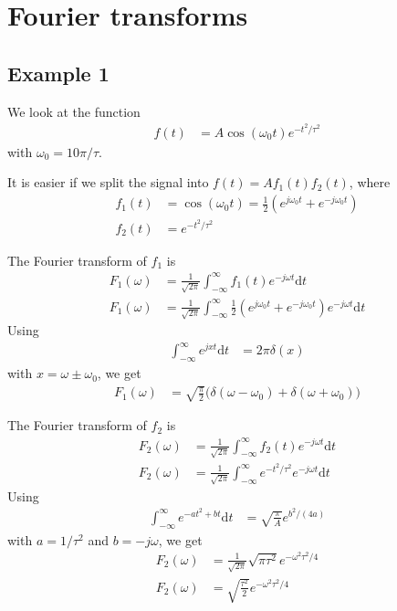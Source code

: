 \documentclass[twocolumn]{myarticle}
\renewcommand{\d}{\mathrm{d}}
\begin{document}
\section{Fourier transforms}
\label{sec:fourier_transforms}

\subsection{Example 1}
\label{subsec:example_1}

We look at the function
\begin{align}
    f(t) &= A \cos(\omega_0 t) e^{-t^2 / \tau^2}
\end{align}
with $ \omega_0 = 10 \pi / \tau $.

It is easier if we split the signal into $ f(t) = A f_1(t) f_2(t) $, where
\begin{align}
    f_1(t) &= \cos(\omega_0 t) = \frac{1}{2} \left( e^{j \omega_0 t} + e^{-j \omega_0 t} \right)
    \\
    f_2(t) &= e^{-t^2 / \tau^2}
\end{align}

The Fourier transform of $ f_1 $ is
\begin{align}
    F_1(\omega) &= \frac{1}{\sqrt{2 \pi}} \int_{-\infty}^{\infty} f_1(t) e^{-j \omega t} \d t
    \\
    F_1(\omega) &= \frac{1}{\sqrt{2 \pi}} \int_{-\infty}^{\infty} \frac{1}{2} \left( e^{j \omega_0 t} + e^{-j \omega_0 t} \right) e^{-j \omega t} \d t
\end{align}
Using
\begin{align}
    \int_{-\infty}^{\infty} e^{jxt} \d t &= 2 \pi \delta(x)
\end{align}
with $ x = \omega \pm \omega_0 $, we get
\begin{align}
    F_1(\omega) &= \sqrt{\frac{\pi}{2}} \big( \delta(\omega - \omega_0) + \delta(\omega + \omega_0) \big) 
\end{align}

The Fourier transform of $ f_2 $ is
\begin{align}
    F_2(\omega) &= \frac{1}{\sqrt{2 \pi}} \int_{-\infty}^{\infty} f_2(t) e^{-j \omega t} \d t
    \\
    F_2(\omega) &= \frac{1}{\sqrt{2 \pi}} \int_{-\infty}^{\infty} e^{-t^2/\tau^2} e^{-j \omega t} \d t
\end{align}
Using
\begin{align}
    \int_{-\infty}^{\infty} e^{-a t^2 + bt} \d t &= \sqrt{\frac{\pi}{A}} e^{b^2/(4a)}
\end{align}
with $ a = 1/\tau^2 $ and $ b = -j \omega $, we get
\begin{align}
    F_2(\omega) &= \frac{1}{\sqrt{2 \pi}} \sqrt{\pi \tau^2} e^{- \omega^2 \tau^2 / 4}
    \\
    F_2(\omega) &= \sqrt{\frac{\tau^2}{2}} e^{- \omega^2 \tau^2 / 4}
\end{align}
\end{document}
